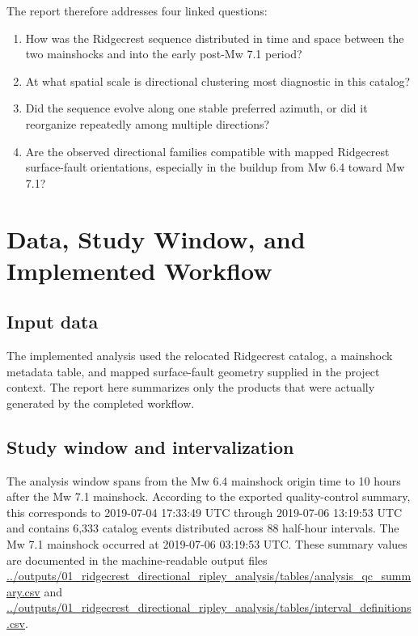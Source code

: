 \documentclass[11pt]{article}
\begin{document}
The report therefore addresses four linked questions:
\begin{enumerate}[leftmargin=2em]
    \item How was the Ridgecrest sequence distributed in time and space between the two mainshocks and into the early post-Mw 7.1 period?
    \item At what spatial scale is directional clustering most diagnostic in this catalog?
    \item Did the sequence evolve along one stable preferred azimuth, or did it reorganize repeatedly among multiple directions?
    \item Are the observed directional families compatible with mapped Ridgecrest surface-fault orientations, especially in the buildup from Mw 6.4 toward Mw 7.1?
\end{enumerate}

\section{Data, Study Window, and Implemented Workflow}
\subsection{Input data}
The implemented analysis used the relocated Ridgecrest catalog, a mainshock metadata table, and mapped surface-fault geometry supplied in the project context. The report here summarizes only the products that were actually generated by the completed workflow.

\subsection{Study window and intervalization}
The analysis window spans from the Mw 6.4 mainshock origin time to 10 hours after the Mw 7.1 mainshock. According to the exported quality-control summary, this corresponds to 2019-07-04 17:33:49 UTC through 2019-07-06 13:19:53 UTC and contains 6,333 catalog events distributed across 88 half-hour intervals. The Mw 7.1 mainshock occurred at 2019-07-06 03:19:53 UTC. These summary values are documented in the machine-readable output files
\url{../outputs/01_ridgecrest_directional_ripley_analysis/tables/analysis_qc_summary.csv}
and
\url{../outputs/01_ridgecrest_directional_ripley_analysis/tables/interval_definitions.csv}.
\end{document}
